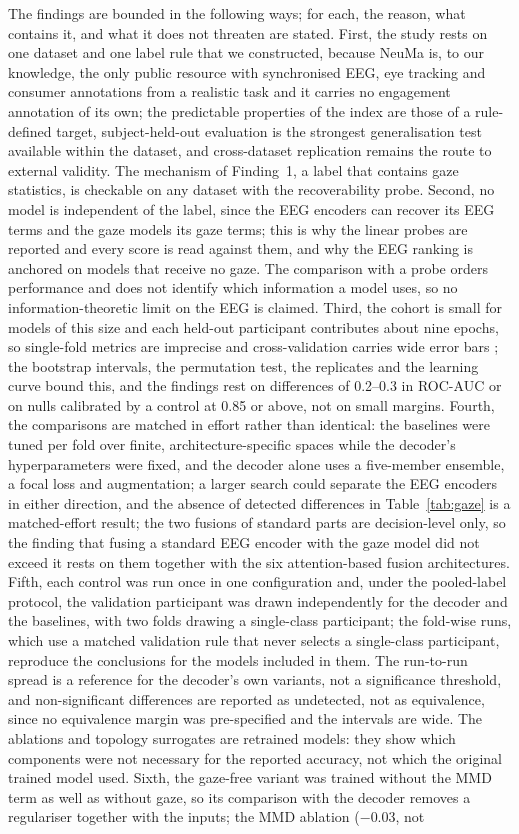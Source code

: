 The findings are bounded in the following ways; for each, the reason, what contains it, and what it does not threaten are stated. First, the study rests on one dataset and one label rule that we constructed, because NeuMa is, to our knowledge, the only public resource with synchronised EEG, eye tracking and consumer annotations from a realistic task and it carries no engagement annotation of its own; the predictable properties of the index are those of a rule-defined target, subject-held-out evaluation is the strongest generalisation test available within the dataset, and cross-dataset replication remains the route to external validity. The mechanism of Finding~1, a label that contains gaze statistics, is checkable on any dataset with the recoverability probe. Second, no model is independent of the label, since the EEG encoders can recover its EEG terms and the gaze models its gaze terms; this is why the linear probes are reported and every score is read against them, and why the EEG ranking is anchored on models that receive no gaze. The comparison with a probe orders performance and does not identify which information a model uses, so no information-theoretic limit on the EEG is claimed. Third, the cohort is small for models of this size and each held-out participant contributes about nine epochs, so single-fold metrics are imprecise and cross-validation carries wide error bars \cite{ref63}; the bootstrap intervals, the permutation test, the replicates and the learning curve bound this, and the findings rest on differences of 0.2--0.3 in ROC-AUC or on nulls calibrated by a control at 0.85 or above, not on small margins. Fourth, the comparisons are matched in effort rather than identical: the baselines were tuned per fold over finite, architecture-specific spaces while the decoder's hyperparameters were fixed, and the decoder alone uses a five-member ensemble, a focal loss and augmentation; a larger search could separate the EEG encoders in either direction, and the absence of detected differences in Table~\ref{tab:gaze} is a matched-effort result; the two fusions of standard parts are decision-level only, so the finding that fusing a standard EEG encoder with the gaze model did not exceed it rests on them together with the six attention-based fusion architectures. Fifth, each control was run once in one configuration and, under the pooled-label protocol, the validation participant was drawn independently for the decoder and the baselines, with two folds drawing a single-class participant; the fold-wise runs, which use a matched validation rule that never selects a single-class participant, reproduce the conclusions for the models included in them. The run-to-run spread is a reference for the decoder's own variants, not a significance threshold, and non-significant differences are reported as undetected, not as equivalence, since no equivalence margin was pre-specified and the intervals are wide. The ablations and topology surrogates are retrained models: they show which components were not necessary for the reported accuracy, not which the original trained model used. Sixth, the gaze-free variant was trained without the MMD term as well as without gaze, so its comparison with the decoder removes a regulariser together with the inputs; the MMD ablation ($-0.03$, not 